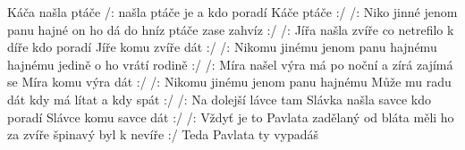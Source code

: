 \begin{TEXT}{Káča našla ptáče}
\SLOKA /:  našla ptáče je  a 
kdo poradí Káče  ptáče  :/
/: Niko jinné jenom panu hajné
on ho dá do hníz ptáče zase zahvíz :/
\SLOKA /: Jířa našla zvíře co netrefilo k díře
kdo poradí Jíře komu zvíře dát :/
/: Nikomu jinému jenom panu hajnému 
hajnému jedině o ho vrátí rodině :/
\SLOKA /: Míra našel výra má po noční a zírá
zajímá se Míra komu výra dát :/
/: Nikomu jinému jenom panu hajnému 
Může mu radu dát kdy má lítat a kdy spát :/
\SLOKA /: Na dolejší lávce tam Slávka našla savce
kdo poradí Slávce komu savce dát :/
/: Vždyť je to Pavlata zadělaný od bláta
měli ho za zvíře špinavý byl k nevíře :/
\REFREN Teda Pavlata ty vypadáš
\end{TEXT}